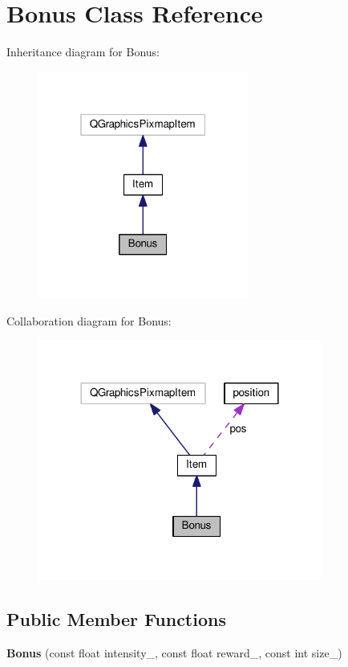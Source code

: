 \hypertarget{class_bonus}{}\section{Bonus Class Reference}
\label{class_bonus}


Inheritance diagram for Bonus\+:\nopagebreak
\begin{figure}[H]
\begin{center}
\leavevmode
\includegraphics[width=196pt]{class_bonus__inherit__graph}
\end{center}
\end{figure}


Collaboration diagram for Bonus\+:\nopagebreak
\begin{figure}[H]
\begin{center}
\leavevmode
\includegraphics[width=264pt]{class_bonus__coll__graph}
\end{center}
\end{figure}
\subsection*{Public Member Functions}
\begin{DoxyCompactItemize}
\item 
{\bfseries Bonus} (const float intensity\+\_\+, const float reward\+\_\+, const int size\+\_\+)\hypertarget{class_bonus_a151ace5d3747c97287fe7b338f14f3fb}{}\label{class_bonus_a151ace5d3747c97287fe7b338f14f3fb}

\end{DoxyCompactItemize}

